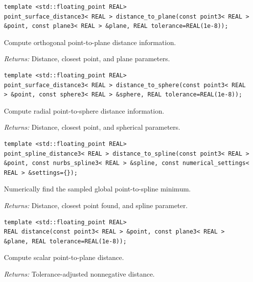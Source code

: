 \par\noindent\begin{minipage}{\linewidth}
\begin{lstlisting}[style=apireference]
template <std::floating_point REAL>
point_surface_distance3< REAL > distance_to_plane(const point3< REAL > &point, const plane3< REAL > &plane, REAL tolerance=REAL(1e-8));
\end{lstlisting}
{\footnotesize Compute orthogonal point-to-plane distance information.\par}
{\footnotesize\textit{Returns:} Distance, closest point, and plane parameters.\par}
\end{minipage}\par\vspace{1pt}
\par\noindent\begin{minipage}{\linewidth}
\begin{lstlisting}[style=apireference]
template <std::floating_point REAL>
point_surface_distance3< REAL > distance_to_sphere(const point3< REAL > &point, const sphere3< REAL > &sphere, REAL tolerance=REAL(1e-8));
\end{lstlisting}
{\footnotesize Compute radial point-to-sphere distance information.\par}
{\footnotesize\textit{Returns:} Distance, closest point, and spherical parameters.\par}
\end{minipage}\par\vspace{1pt}
\par\noindent\begin{minipage}{\linewidth}
\begin{lstlisting}[style=apireference]
template <std::floating_point REAL>
point_spline_distance3< REAL > distance_to_spline(const point3< REAL > &point, const nurbs_spline3< REAL > &spline, const numerical_settings< REAL > &settings={});
\end{lstlisting}
{\footnotesize Numerically find the sampled global point-to-spline minimum.\par}
{\footnotesize\textit{Returns:} Distance, closest point found, and spline parameter.\par}
\end{minipage}\par\vspace{1pt}
\par\noindent\begin{minipage}{\linewidth}
\begin{lstlisting}[style=apireference]
template <std::floating_point REAL>
REAL distance(const point3< REAL > &point, const plane3< REAL > &plane, REAL tolerance=REAL(1e-8));
\end{lstlisting}
{\footnotesize Compute scalar point-to-plane distance.\par}
{\footnotesize\textit{Returns:} Tolerance-adjusted nonnegative distance.\par}
\end{minipage}\par\vspace{1pt}
